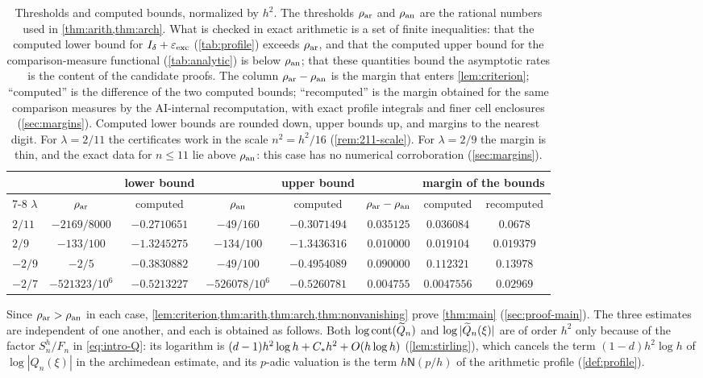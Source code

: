 \begin{table}[ht]
\centering
\caption{Thresholds and computed bounds, normalized by $h^2$. The thresholds $\rho_{\mathrm{ar}}$ and $\rho_{\mathrm{an}}$ are the rational numbers used in \cref{thm:arith,thm:arch}. What is checked in exact arithmetic is a set of finite inequalities: that the computed lower bound for $I_\delta+\varepsilon_{\mathrm{exc}}$ (\cref{tab:profile}) exceeds $\rho_{\mathrm{ar}}$, and that the computed upper bound for the comparison-measure functional (\cref{tab:analytic}) is below $\rho_{\mathrm{an}}$; that these quantities bound the asymptotic rates is the content of the candidate proofs. The column $\rho_{\mathrm{ar}}-\rho_{\mathrm{an}}$ is the margin that enters \cref{lem:criterion}; ``computed'' is the difference of the two computed bounds; ``recomputed'' is the margin obtained for the same comparison measures by the AI-internal recomputation, with exact profile integrals and finer cell enclosures (\cref{sec:margins}). Computed lower bounds are rounded down, upper bounds up, and margins to the nearest digit. For $\lambda=2/11$ the certificates work in the scale $n^2=h^2/16$ (\cref{rem:211-scale}). For $\lambda=2/9$ the margin is thin, and the exact data for $n\le11$ lie above $\rho_{\mathrm{an}}$: this case has no numerical corroboration (\cref{sec:margins}).}
\label{tab:rates}
\footnotesize
\setlength{\tabcolsep}{3.5pt}
\begin{tabular}{@{}lccccccc@{}}
\toprule
 & & lower bound & & upper bound & & \multicolumn{2}{c}{margin of the bounds}\\
\cmidrule(l){7-8}
$\lambda$ & $\rho_{\mathrm{ar}}$ & computed & $\rho_{\mathrm{an}}$ & computed & $\rho_{\mathrm{ar}}-\rho_{\mathrm{an}}$ & computed & recomputed\\
\midrule
$2/11$ & $-2169/8000$ & $-0.2710651$ & $-49/160$ & $-0.3071494$ & $0.035125$ & $0.036084$ & $0.0678$\\
$2/9$ & $-133/100$ & $-1.3245275$ & $-134/100$ & $-1.3436316$ & $0.010000$ & $0.019104$ & $0.019379$\\
$-2/9$ & $-2/5$ & $-0.3830882$ & $-49/100$ & $-0.4954089$ & $0.090000$ & $0.112321$ & $0.13978$\\
$-2/7$ & $-521323/10^6$ & $-0.5213227$ & $-526078/10^6$ & $-0.5260781$ & $0.004755$ & $0.0047556$ & $0.02969$\\
\bottomrule
\end{tabular}
\end{table}

Since $\rho_{\mathrm{ar}}>\rho_{\mathrm{an}}$ in each case, \cref{lem:criterion,thm:arith,thm:arch,thm:nonvanishing} prove \cref{thm:main} (\cref{sec:proof-main}). The three estimates are independent of one another, and each is obtained as follows. Both $\log\operatorname{cont}(\widetilde{Q}_n)$ and $\log|\widetilde{Q}_n(\xi)|$ are of order $h^2$ only because of the factor $S_n^h/F_n$ in \eqref{eq:intro-Q}: its logarithm is $(d-1)h^2\log h+C_{*} h^2+O(h\log h)$ (\cref{lem:stirling}), which cancels the term $(1-d)h^2\log h$ of $\log|Q_n(\xi)|$ in the archimedean estimate, and its $p$-adic valuation is the term $h\mathsf N(p/h)$ of the arithmetic profile (\cref{def:profile}).

